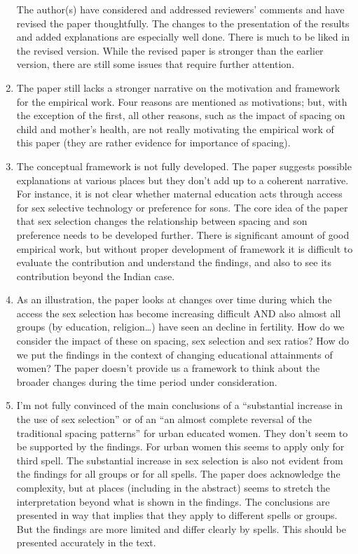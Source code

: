 \documentclass[letterpaper,12pt]{article}
\begin{document}
\begin{enumerate}

The author(s) have considered and addressed reviewers’ comments and have
revised the paper thoughtfully. The changes to the presentation of the
results and added explanations are especially well done. There is much
to be liked in the revised version. While the revised paper is stronger
than the earlier version, there are still some issues that require
further attention.

\item The paper still lacks a stronger narrative on the motivation and
framework for the empirical work. Four reasons are mentioned as
motivations; but, with the exception of the first, all other reasons,
such as the impact of spacing on child and mother’s health, are not
really motivating the empirical work of this paper (they are rather
evidence for importance of spacing).

\item The conceptual framework is not fully developed. The paper suggests
possible explanations at various places but they don’t add up to a
coherent narrative. For instance, it is not clear whether maternal
education acts through access for sex selective technology or preference
for sons. The core idea of the paper that sex selection changes the
relationship between spacing and son preference needs to be developed
further. There is significant amount of good empirical work, but without
proper development of framework it is difficult to evaluate the
contribution and understand the findings, and also to see its
contribution beyond the Indian case.

\item As an illustration, the paper looks at changes over time during which
the access the sex selection has become increasing difficult AND also
almost all groups (by education, religion…) have seen an decline in
fertility. How do we consider the impact of these on spacing, sex
selection and sex ratios? How do we put the findings in the context of
changing educational attainments of women? The paper doesn’t provide us
a framework to think about the broader changes during the time period
under consideration.

\item I’m not fully convinced of the main conclusions of a “substantial
increase in the use of sex selection” or of an “an almost complete
reversal of the traditional spacing patterns” for urban educated women.
They don’t seem to be supported by the findings. For urban women this
seems to apply only for third spell. The substantial increase in sex
selection is also not evident from the findings for all groups or for
all spells. The paper does acknowledge the complexity, but at places
(including in the abstract) seems to stretch the interpretation beyond
what is shown in the findings. The conclusions are presented in way that
implies that they apply to different spells or groups. But the findings
are more limited and differ clearly by spells. This should be presented
accurately in the text.


\end{enumerate}
\end{document}
